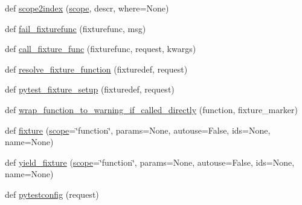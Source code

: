 \begin{DoxyCompactItemize}
\item 
def \hyperlink{namespace__pytest_1_1fixtures_a819d1c10ac18ab8e0b5a879fad486139}{scope2index} (\hyperlink{namespace__pytest_1_1fixtures_a13dd74c58426e1e7d1f13069b3caffee}{scope}, descr, where=None)
\item 
def \hyperlink{namespace__pytest_1_1fixtures_ab4db5207efee05fed81a09e34db5a9d8}{fail\+\_\+fixturefunc} (fixturefunc, msg)
\item 
def \hyperlink{namespace__pytest_1_1fixtures_ae5ee458ad8ebcfb047be1634d070a471}{call\+\_\+fixture\+\_\+func} (fixturefunc, request, kwargs)
\item 
def \hyperlink{namespace__pytest_1_1fixtures_a0a6fb5395a06f72a7f10b75dbf46fb21}{resolve\+\_\+fixture\+\_\+function} (fixturedef, request)
\item 
def \hyperlink{namespace__pytest_1_1fixtures_aed1459f1e2e4ded96083b27b1a0cbcef}{pytest\+\_\+fixture\+\_\+setup} (fixturedef, request)
\item 
def \hyperlink{namespace__pytest_1_1fixtures_a52468614fd8fd54547e07684ef6de052}{wrap\+\_\+function\+\_\+to\+\_\+warning\+\_\+if\+\_\+called\+\_\+directly} (function, fixture\+\_\+marker)
\item 
def \hyperlink{namespace__pytest_1_1fixtures_a7f10df0ff0d8d2c5e29e89f022c59d15}{fixture} (\hyperlink{namespace__pytest_1_1fixtures_a13dd74c58426e1e7d1f13069b3caffee}{scope}=\char`\"{}function\char`\"{}, params=None, autouse=False, ids=None, name=None)
\item 
def \hyperlink{namespace__pytest_1_1fixtures_ad7ab41d1dd454c1b1c2c4f638d1def30}{yield\+\_\+fixture} (\hyperlink{namespace__pytest_1_1fixtures_a13dd74c58426e1e7d1f13069b3caffee}{scope}=\char`\"{}function\char`\"{}, params=None, autouse=False, ids=None, name=None)
\item 
def \hyperlink{namespace__pytest_1_1fixtures_a711059d3b8fdee306cc7126243cf9528}{pytestconfig} (request)
\end{DoxyCompactItemize}
